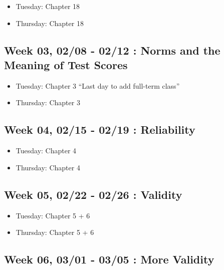 \documentclass[11pt,]{article}
\providecommand{\tightlist}{%
  \setlength{\itemsep}{0pt}\setlength{\parskip}{0pt}}
\begin{document}
\begin{itemize}
\tightlist
\item
  Tuesday: Chapter 18
\item
  Thursday: Chapter 18
\end{itemize}

\hypertarget{week-03-0208---0212-norms-and-the-meaning-of-test-scores}{%
\subsection{Week 03, 02/08 - 02/12 : Norms and the Meaning of Test
Scores}\label{week-03-0208---0212-norms-and-the-meaning-of-test-scores}}

\begin{itemize}
\tightlist
\item
  Tuesday: Chapter 3 ``Last day to add full-term class''
\item
  Thursday: Chapter 3
\end{itemize}

\hypertarget{week-04-0215---0219-reliability}{%
\subsection{Week 04, 02/15 - 02/19 :
Reliability}\label{week-04-0215---0219-reliability}}

\begin{itemize}
\tightlist
\item
  Tuesday: Chapter 4
\item
  Thursday: Chapter 4
\end{itemize}

\hypertarget{week-05-0222---0226-validity}{%
\subsection{Week 05, 02/22 - 02/26 :
Validity}\label{week-05-0222---0226-validity}}

\begin{itemize}
\tightlist
\item
  Tuesday: Chapter 5 + 6
\item
  Thursday: Chapter 5 + 6
\end{itemize}

\hypertarget{week-06-0301---0305-more-validity}{%
\subsection{Week 06, 03/01 - 03/05 : More
Validity}\label{week-06-0301---0305-more-validity}}
\end{document}
